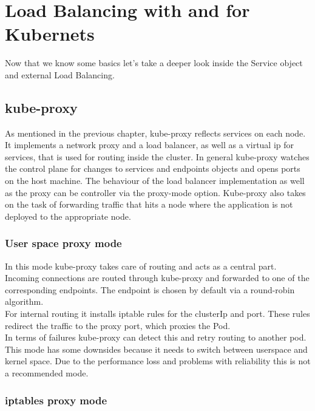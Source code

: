 \chapter{Load Balancing with and for Kubernets}

Now that we know some basics let's take a deeper look inside the Service object and external Load Balancing.

\section{kube-proxy}\label{sec:kubeproxy}

As mentioned in the previous chapter, kube-proxy reflects services on each node.
It implements a network proxy and a load balancer, as well as a virtual ip for services, that is used for routing inside the cluster.
In general kube-proxy watches the control plane for changes to services and endpoints objects and opens ports on the host machine.
The behaviour of the load balancer implementation as well as the proxy can be controller via the proxy-mode option.
Kube-proxy also takes on the task of forwarding traffic that hits a node where the application is not deployed to the appropriate node.

\subsection{User space proxy mode}

In this mode kube-proxy takes care of routing and acts as a central part.
\\
Incoming connections are routed through kube-proxy and forwarded to one of the corresponding endpoints.
The endpoint is chosen by default via a round-robin algorithm.
\\
For internal routing it installs iptable rules for the clusterIp and port.
These rules redirect the traffic to the proxy port, which proxies the Pod.
\\
In terms of failures kube-proxy can detect this and retry routing to another pod.
\\
This mode has some downsides because it needs to switch between userspace and kernel space.
Due to the performance loss and problems with reliability this is not a recommended mode.

\subsection{iptables proxy mode}

